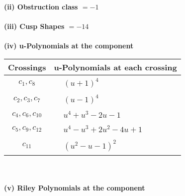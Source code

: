 \documentclass[1p]{elsarticle_modified}
\theoremstyle{definition}
\begin{document}
\flushleft \textbf{(ii) Obstruction class $= -1$}\\~\\
\flushleft \textbf{(iii) Cusp Shapes $= -14$}\\~\\
\newpage\renewcommand{\arraystretch}{1}
\flushleft \textbf{(iv) u-Polynomials at the component}\newline \\
\begin{tabular}{m{50pt}|m{274pt}}
Crossings & \hspace{64pt}u-Polynomials at each crossing \\
\hline $$\begin{aligned}c_{1},c_{8}\end{aligned}$$&$\begin{aligned}
&(u+1)^4
\end{aligned}$\\
\hline $$\begin{aligned}c_{2},c_{3},c_{7}\end{aligned}$$&$\begin{aligned}
&(u-1)^4
\end{aligned}$\\
\hline $$\begin{aligned}c_{4},c_{6},c_{10}\end{aligned}$$&$\begin{aligned}
&u^4+u^3-2 u-1
\end{aligned}$\\
\hline $$\begin{aligned}c_{5},c_{9},c_{12}\end{aligned}$$&$\begin{aligned}
&u^4- u^3+2 u^2-4 u+1
\end{aligned}$\\
\hline $$\begin{aligned}c_{11}\end{aligned}$$&$\begin{aligned}
&(u^2- u-1)^2
\end{aligned}$\\
\hline
\end{tabular}\\~\\
\newpage\renewcommand{\arraystretch}{1}
\flushleft \textbf{(v) Riley Polynomials at the component}\newline \\
\end{document}
